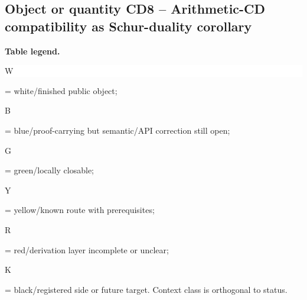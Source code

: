 \subsection*{Object or quantity CD8 -- Arithmetic-CD compatibility as Schur-duality corollary}
\hypertarget{objproof:CD8}{}
\par\smallskip\noindent\begin{minipage}{0.99\linewidth}\footnotesize\raggedright\textbf{Table legend.} \colorbox{white}{\strut W} = white/finished public object; \colorbox{cyan!20}{\strut B} = blue/proof-carrying but semantic/API correction still open; \colorbox{green!18}{\strut G} = green/locally closable; \colorbox{yellow!25}{\strut Y} = yellow/known route with prerequisites; \colorbox{red!20}{\strut R} = red/derivation layer incomplete or unclear; \colorbox{black!18}{\strut K} = black/registered side or future target. Context class is orthogonal to status.\end{minipage}\par\vspace{0.25em}
